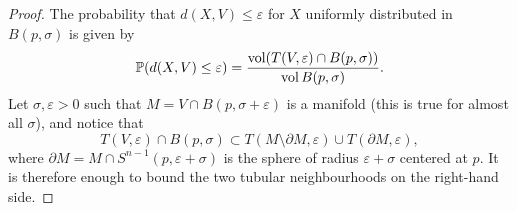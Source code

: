 \begin{proof}
The probability that $d(X,V)\leq \varepsilon$ for $X$ uniformly distributed in $B(p,\sigma)$ is given by
\begin{equation*}
  \mathbb{P}(d(X, V)\leq \varepsilon) = \frac{\operatorname{vol} (T(V,\varepsilon)\cap B(p,\sigma))}{\operatorname{vol} B(p,\sigma)}.
\end{equation*}
Let $\sigma, \varepsilon > 0$ such that $M = V \cap B(p, \sigma + \varepsilon)$ is a manifold (this is true for almost all $\sigma$), and notice that
\begin{equation*}
T(V, \varepsilon) \cap B(p, \sigma) \subset T(M \setminus \partial M, \varepsilon) \cup T(\partial M, \varepsilon),
\end{equation*}
where $\partial M=M\cap S^{n-1}(p, \varepsilon+\sigma)$ is the sphere of radius $\varepsilon+\sigma$ centered at $p$.
It is therefore enough to bound the two tubular neighbourhoods on the right-hand side.


\end{proof}
